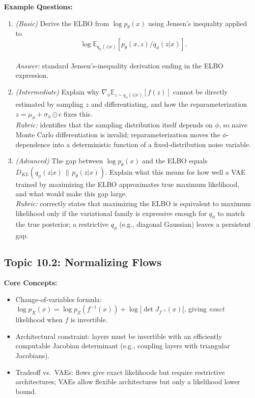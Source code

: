 \documentclass[11pt]{article}
\begin{document}
\textbf{Example Questions:}
\begin{enumerate}
  \item \textit{(Basic)} Derive the ELBO from $\log p_\theta(x)$ using Jensen's inequality applied to
  \[ \log \mathbb E_{q_\phi(z|x)}\!\left[p_\theta(x,z)/q_\phi(z|x)\right]. \] \\
  \textit{Answer:} standard Jensen's-inequality derivation ending in the ELBO expression.
  \item \textit{(Intermediate)} Explain why $\nabla_\phi \mathbb E_{z \sim q_\phi(z|x)}[f(z)]$ cannot be directly estimated by sampling $z$ and differentiating, and how the reparameterization $z = \mu_\phi + \sigma_\phi \odot \epsilon$ fixes this. \\
  \textit{Rubric:} identifies that the sampling distribution itself depends on $\phi$, so naive Monte Carlo differentiation is invalid; reparameterization moves the $\phi$-dependence into a deterministic function of a fixed-distribution noise variable.
  \item \textit{(Advanced)} The gap between $\log p_\theta(x)$ and the ELBO equals $D_{KL}(q_\phi(z|x)\,\|\,p_\theta(z|x))$. Explain what this means for how well a VAE trained by maximizing the ELBO approximates true maximum likelihood, and what would make this gap large. \\
  \textit{Rubric:} correctly states that maximizing the ELBO is equivalent to maximum likelihood only if the variational family is expressive enough for $q_\phi$ to match the true posterior; a restrictive $q_\phi$ (e.g., diagonal Gaussian) leaves a persistent gap.
\end{enumerate}

\subsection{Topic 10.2: Normalizing Flows}

\textbf{Core Concepts:}
\begin{itemize}
  \item Change-of-variables formula: $\log p_X(x) = \log p_Z(f^{-1}(x)) + \log\left|\det J_{f^{-1}}(x)\right|$, giving \emph{exact} likelihood when $f$ is invertible.
  \item Architectural constraint: layers must be invertible with an efficiently computable Jacobian determinant (e.g., coupling layers with triangular Jacobians).
  \item Tradeoff vs.\ VAEs: flows give exact likelihoods but require restrictive architectures; VAEs allow flexible architectures but only a likelihood lower bound.
\end{itemize}
\end{document}
